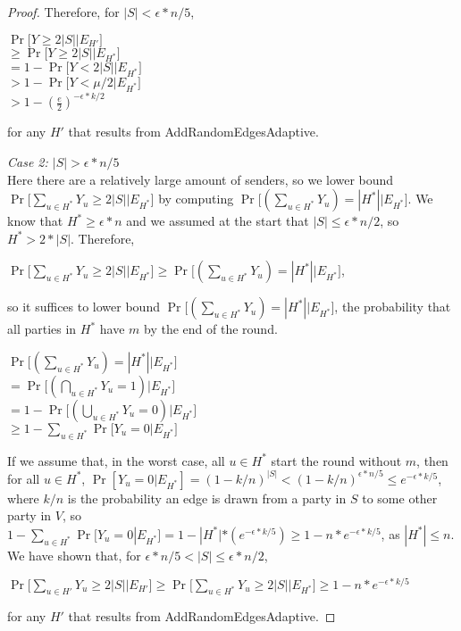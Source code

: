 \documentclass{article}
\begin{document}
\begin{proof}
Therefore, for $|S| < \epsilon * n / 5$, 
\begin{center}
    $\Pr \big [Y \geq 2|S| \big | E_{H'} \big]$ \\
    $ \geq \Pr\big [Y \geq 2|S| \big | E_{H^*}\big ]$ \\ $ = 1 - \Pr\big [Y < 2|S| \big | E_{H^*}] $ \\ $> 1 - \Pr\big [Y < \mu / 2 \big | E_{H^*}\big ]$ \\ $ > 1 - (\frac{e}{2})^{-\epsilon*k/2}$
\end{center}

for any $H'$ that results from AddRandomEdgesAdaptive.

\textit{Case 2: $|S| > \epsilon * n/5$}\\
Here there are a relatively large amount of senders, so we lower bound $\Pr\big [\sum_{u \in {H^*}} Y_u \geq 2|S| \big | E_{H^*}\big ]$ by computing $\Pr\big [(\sum_{u \in {H^*}} Y_u) = |H^*| \big | E_{H^*}\big ]$. We know that $H^* \geq \epsilon * n$ and we assumed at the start that $|S| \leq \epsilon * n / 2$, so $H^* > 2*|S|$. Therefore,
\begin{center}
    $\Pr\big [\sum_{u \in {H^*}} Y_u \geq 2|S| \big | E_{H^*}\big ] \geq \Pr\big [(\sum_{u \in {H^*}} Y_u) = |H^*| \big | E_{H^*}\big ]$,
\end{center}
so it suffices to lower bound $\Pr\big [(\sum_{u \in {H^*}} Y_u) = |H^*| \big | E_{H^*}\big ]$, the probability that all parties in $H^*$ have $m$ by the end of the round. 

\begin{center}
$\Pr\big [(\sum_{u \in {H^*}} Y_u) = |H^*| \big | E_{H^*}\big ] $\\ $= \Pr\big [(\bigcap_{u \in {H^*}} Y_u = 1)\big | E_{H^*}\big ]$ \\$ = 1 - \Pr\big[(\bigcup_{u \in {H^*}} Y_u = 0)\big | E_{H^*}\big ]$ \\ $\geq 1 - \sum_{u \in {H^*}} \Pr\big [Y_u = 0 \big | E_{H^*}\big ]$

\end{center}

If we assume that, in the worst case, all $u \in H^*$ start the round without $m$, then for all $u \in H^*$, $\Pr[Y_u = 0 | E_{H^*}] = (1 - k/n)^{|S|} < (1 - k/n)^{\epsilon * n/5} \leq e^{-\epsilon * k / 5}$, where $k/n$ is the probability an edge is drawn from a party in $S$ to some other party in $V$, so  $1 - \sum_{u \in {H^*}} \Pr[Y_u = 0 | E_{H^*}] = 1 - |H^*| * (e^{-\epsilon * k / 5}) \geq 1 - n * e^{-\epsilon * k / 5}$, as $|H^*| \leq n$. We have shown that, for $ \epsilon * n/5 < |S| \leq \epsilon * n / 2$, 
\begin{center}
    $\Pr\big [\sum_{u \in {H'}} Y_u \geq 2|S| \big | E_{H'}\big ] \geq \Pr\big [\sum_{u \in {H^*}} Y_u \geq 2|S| \big | E_{H^*}\big ] \geq 1 - n * e^{-\epsilon * k / 5}$
\end{center}
for any $H'$ that results from AddRandomEdgesAdaptive.


\end{proof}
\end{document}
